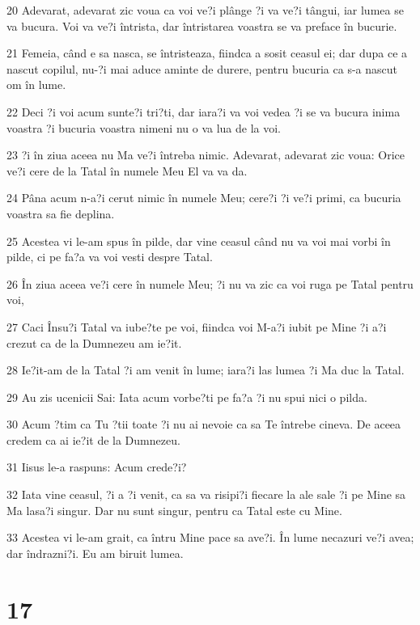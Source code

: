 \par 20 Adevarat, adevarat zic voua ca voi ve?i plânge ?i va ve?i tângui, iar lumea se va bucura. Voi va ve?i întrista, dar întristarea voastra se va preface în bucurie.
\par 21 Femeia, când e sa nasca, se întristeaza, fiindca a sosit ceasul ei; dar dupa ce a nascut copilul, nu-?i mai aduce aminte de durere, pentru bucuria ca s-a nascut om în lume.
\par 22 Deci ?i voi acum sunte?i tri?ti, dar iara?i va voi vedea ?i se va bucura inima voastra ?i bucuria voastra nimeni nu o va lua de la voi.
\par 23 ?i în ziua aceea nu Ma ve?i întreba nimic. Adevarat, adevarat zic voua: Orice ve?i cere de la Tatal în numele Meu El va va da.
\par 24 Pâna acum n-a?i cerut nimic în numele Meu; cere?i ?i ve?i primi, ca bucuria voastra sa fie deplina.
\par 25 Acestea vi le-am spus în pilde, dar vine ceasul când nu va voi mai vorbi în pilde, ci pe fa?a va voi vesti despre Tatal.
\par 26 În ziua aceea ve?i cere în numele Meu; ?i nu va zic ca voi ruga pe Tatal pentru voi,
\par 27 Caci Însu?i Tatal va iube?te pe voi, fiindca voi M-a?i iubit pe Mine ?i a?i crezut ca de la Dumnezeu am ie?it.
\par 28 Ie?it-am de la Tatal ?i am venit în lume; iara?i las lumea ?i Ma duc la Tatal.
\par 29 Au zis ucenicii Sai: Iata acum vorbe?ti pe fa?a ?i nu spui nici o pilda.
\par 30 Acum ?tim ca Tu ?tii toate ?i nu ai nevoie ca sa Te întrebe cineva. De aceea credem ca ai ie?it de la Dumnezeu.
\par 31 Iisus le-a raspuns: Acum crede?i?
\par 32 Iata vine ceasul, ?i a ?i venit, ca sa va risipi?i fiecare la ale sale ?i pe Mine sa Ma lasa?i singur. Dar nu sunt singur, pentru ca Tatal este cu Mine.
\par 33 Acestea vi le-am grait, ca întru Mine pace sa ave?i. În lume necazuri ve?i avea; dar îndrazni?i. Eu am biruit lumea.

\chapter{17}

